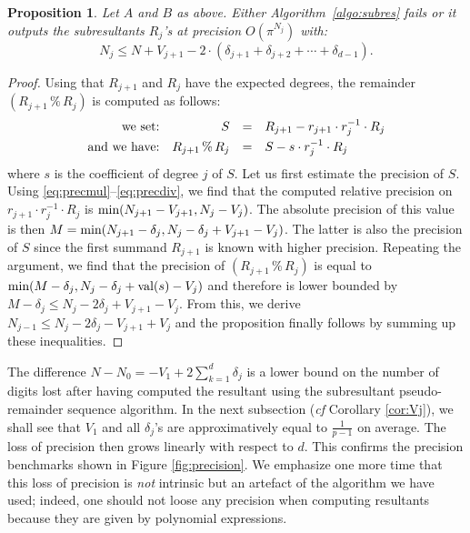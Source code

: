 \documentclass{jT}
\numberwithin{equation}{section}
\DeclareMathOperator{\val}{val}
\newtheorem{prop}[theo]{Proposition}
\theoremstyle{definition}
\renewcommand{\min}{\text{\rm min}}
\renewcommand{\val}{\text{\rm val}}
\begin{document}
\begin{prop}
\label{prop:precEuclide}
Let $A$ and $B$ as above. Either Algorithm~\ref{algo:subres} fails or
it outputs the subresultants $R_j$'s at precision $O(\pi^{N_j})$ with:
$$N_j \leq N + V_{j+1} - 2 \cdot (\delta_{j+1} + \delta_{j+2} + \cdots
+ \delta_{d-1}).$$
\end{prop}

\begin{proof}
Using that $R_{j+1}$ and $R_j$ have the expected degrees, the
remainder $(R_{j+1} \,\%\, R_j)$ is computed as follows:
$$\begin{array}{rrcl}
\text{we set:} & S & = & R_{j+1} - r_{j+1} \cdot r_j^{-1} \cdot R_j \smallskip \\
\text{and we have:} & R_{j+1} \,\%\, R_j & = & S - s \cdot r_j^{-1} \cdot R_j
\end{array}$$
where $s$ is the coefficient of degree $j$ of $S$. Let us first estimate 
the precision of $S$. Using \eqref{eq:precmul}--\eqref{eq:precdiv}, we 
find that the computed relative precision on $r_{j+1} \cdot r_j^{-1} 
\cdot R_j$ is $\min(N_{j+1} - V_{j+1}, N_j - V_j)$. The absolute
precision of this value is then
$M = \min(N_{j+1} - \delta_j, N_j - \delta_j + V_{j+1} - V_j)$. The
latter is also the precision of $S$ since the first summand
$R_{j+1}$ is known with higher precision. Repeating the argument, we
find that the precision of $(R_{j+1} \,\%\, R_j)$ is equal to 
$\min(M - \delta_j, N_j - \delta_j + \val(s) - V_j)$ and therefore is 
lower bounded by $M - \delta_j \leq N_j - 2 \delta_j + V_{j+1} - V_j$.
From this, we derive $N_{j-1} \leq N_j - 2 \delta_j - V_{j+1} + V_j$ and
the proposition finally follows by summing up these inequalities.
\end{proof}

The difference 
$N - N_0 = - V_1 + 2 \sum_{k=1}^d \delta_j$
is a lower bound on the number of digits lost after having computed the 
resultant using the subresultant pseudo-remainder sequence algorithm. In 
the next subsection (\emph{cf} Corollary \ref{cor:Vj}), we shall see that 
$V_1$ and all $\delta_j$'s are 
approximatively equal to $\frac 1 {p-1}$ on average. The loss of 
precision then grows linearly with respect to $d$. This confirms the 
precision benchmarks shown in Figure \ref{fig:precision}.
We emphasize one more time that this loss of precision is \emph{not}
intrinsic but an artefact of the algorithm we have used; indeed, one
should not loose any precision when computing resultants because they
are given by polynomial expressions.
\end{document}
